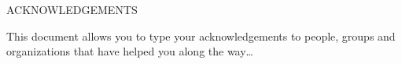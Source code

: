 
\addchaptertocentry{\acknowledgementname} %

\begin{center}
\MakeUppercase{Acknowledgements}\\ \bigskip
\end{center}

This document allows you to type your acknowledgements to people, groups and organizations that have helped you along the way\ldots
